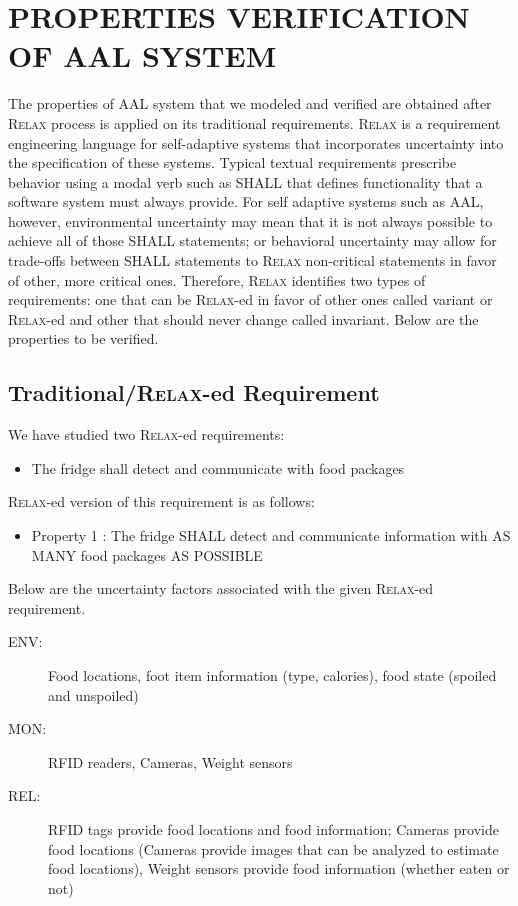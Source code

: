 \documentclass[a4paper,twoside]{article}
\def\myrelax{\textsc{Relax}}                  %
\begin{document}
\section{\uppercase{Properties Verification of AAL system}}
\label{sec:properties}
\noindent The properties of AAL system that we modeled and verified are obtained after \myrelax{} process is applied on its traditional requirements. \myrelax{}  is  a  requirement  engineering language for self-adaptive systems that incorporates uncertainty into the specification of these systems. Typical  textual  requirements  prescribe behavior  using  a  modal  verb  such  as  SHALL  that defines  functionality  that  a  software  system  must always provide. For self adaptive systems such as AAL, however, environmental  uncertainty  may  mean  that  it  is  not always  possible  to  achieve  all  of  those  SHALL statements; or behavioral uncertainty may allow for trade-offs between SHALL statements to \myrelax{} non-critical  statements  in  favor  of  other,  more  critical ones.  Therefore,  \myrelax{} identifies two types of requirements: one that can be \myrelax{}-ed in favor of other ones called variant or \myrelax{}-ed and other that should never change called invariant.
Below are the properties to be verified. 

\subsection{Traditional/\myrelax{}-ed Requirement}

\noindent We have studied two \myrelax{}-ed requirements:
\begin{itemize}
\item The fridge shall detect and communicate with food packages
\end{itemize}

\myrelax{}-ed version of this requirement is as follows:

\begin{itemize}
\item Property 1 : The fridge SHALL detect and communicate information with AS MANY food packages AS POSSIBLE
\end{itemize}

Below are the uncertainty factors associated with the given \myrelax{}-ed requirement.

\begin{description}
\item[ENV:] Food locations, foot item information (type, calories), food state (spoiled and unspoiled)
\item[MON:] RFID readers, Cameras, Weight sensors
\item[REL:] RFID tags provide food locations and food information; Cameras provide food locations (Cameras provide images that can be analyzed to estimate food locations), Weight sensors provide food information (whether eaten or not)
\end{description}
\end{document}
